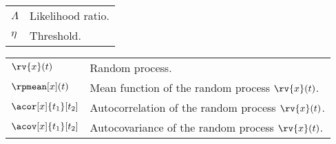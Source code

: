 \begin{table}[h]
    \centering
    \begin{tabular}{p{}p{}}
        $\Lambda$ & Likelihood ratio.\\
        $\eta$ & Threshold.
    \end{tabular}
\end{table}

\begin{table}[h]
    \centering
    \begin{tabular}{p{}p{}}
        $\rv{x}(t)$ & Random process.\\
        $\rpmean[x](t)$   & Mean function of the random process $\rv{x}(t)$.\\
        $\acor[x]{t_{1}}[t_{2}]$ & Autocorrelation of the random process $\rv{x}(t)$.\\
        $\acov[x]{t_{1}}[t_{2}]$ & Autocovariance of the random process $\rv{x}(t)$.
    \end{tabular}
\end{table}
